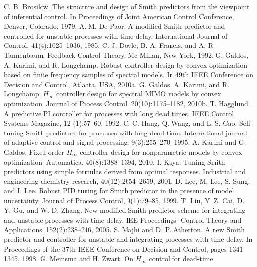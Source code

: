 \documentclass[default]{svmult}
\begin{document}
\begin{thebibliography}{99.}%
%
%
 C. B. Brosilow. The structure and design of Smith
predictors from the viewpoint of inferential control.
In Proceedings of Joint American Control Conference,
Denver, Colorado, 1979.
%
 A. M. De Paor. A modified Smith predictor and controlled
for unstable processes with time delay. International
Journal of Control, 41(4):1025--1036, 1985.
%
 C. J. Doyle, B. A. Francis, and A. R. Tannenbaum.
Feedback Control Theory. Mc Millan, New York, 1992.
%
 G. Galdos, A. Karimi, and R. Longchamp. Robust controller
design by convex optimization based on finite
frequency samples of spectral models. In 49th IEEE
Conference on Decision and Control, Atlanta, USA,
2010a.
%
 G. Galdos, A. Karimi, and R. Longchamp. $H_{\infty}$ controller
design for spectral MIMO models by convex optimization.
Journal of Process Control, 20(10):1175--1182,
2010b.
%
 T. Hagglund. A predictive PI controller for processes with
long dead times. IEEE Control Systems Magazine, 12
(1):57--60, 1992.
%
 C. C. Hang, Q. Wang, and L. S. Cao. Self-tuning Smith
predictors for processes with long dead time. International
journal of adaptive control and signal processing,
9(3):255--270, 1995.
%
 A. Karimi and G. Galdos. Fixed-order $H_{\infty}$ controller design
for nonparametric models by convex optimization.
Automatica, 46(8):1388--1394, 2010.
%
 I. Kaya. Tuning Smith predictors using simple formulas
derived from optimal responses. Industrial and engineering
chemistry research, 40(12):2654--2659, 2001.
%
 D. Lee, M. Lee, S. Sung, and I. Lee. Robust PID tuning
for Smith predictor in the presence of model uncertainty.
Journal of Process Control, 9(1):79--85, 1999.
%
 T. Liu, Y. Z. Cai, D. Y. Gu, and W. D. Zhang. New
modified Smith predictor scheme for integrating and
unstable processes with time delay. IEE Proceedings-
Control Theory and Applications, 152(2):238--246, 2005.
%
 S. Majhi and D. P. Atherton. A new Smith predictor and
controller for unstable and integrating processes with
time delay. In Proceedings of the 37th IEEE Conference
on Decision and Control, pages 1341--1345, 1998.
%
 G. Meinsma and H. Zwart. On $H_\infty$ control for dead-time

\end{thebibliography}
\end{document}
